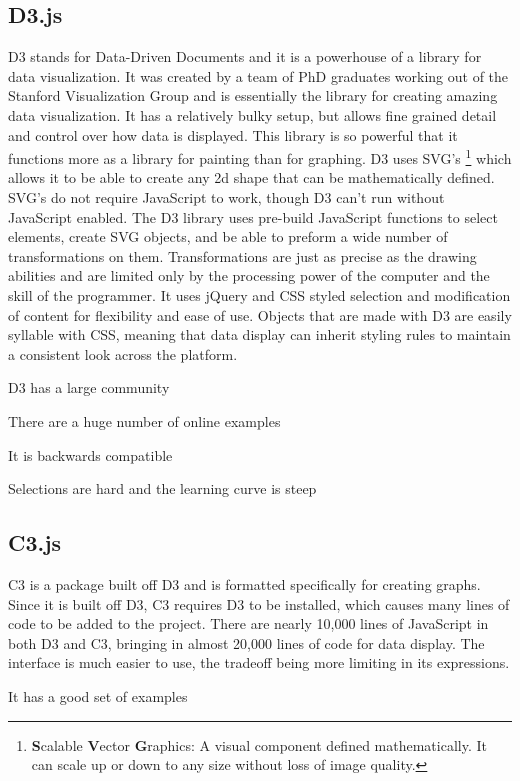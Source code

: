 \documentclass[draftclsnofoot,onecolumn,letterpaper,10pt,compsoc]{IEEEtran}
\begin{document}
  \subsection{D3.js}
  D3 stands for Data-Driven Documents and it is a powerhouse of a library for data visualization.
  It was created by a team of PhD graduates working out of the Stanford Visualization Group and is essentially the library for creating amazing data visualization.
  It has a relatively bulky setup, but allows fine grained detail and control over how data is displayed.
  This library is so powerful that it functions more as a library for painting than for graphing.
  D3 uses SVG's \footnote{\textbf{S}calable \textbf{V}ector \textbf{G}raphics: A visual component defined mathematically. It can scale up or down to any size without loss of image quality.} which allows it to be able to create any 2d shape that can be mathematically defined.
  SVG's do not require JavaScript to work, though D3 can't run without JavaScript enabled.
  The D3 library uses pre-build JavaScript functions to select elements, create SVG objects, and be able to preform a wide number of transformations on them.
  Transformations are just as precise as the drawing abilities and are limited only by the processing power of the computer and the skill of the programmer.
  It uses jQuery and CSS styled selection and modification of content for flexibility and ease of use.
  Objects that are made with D3 are easily syllable with CSS, meaning that data display can inherit styling rules to maintain a consistent look across the platform.

  D3 has a large community

  There are a huge number of online examples

  It is backwards compatible

  Selections are hard and the learning curve is steep

  \subsection{C3.js}
  C3 is a package built off D3 and is formatted specifically for creating graphs.
  Since it is built off D3, C3 requires D3 to be installed, which causes many lines of code to be added to the project.
  There are nearly 10,000 lines of JavaScript in both D3 and C3, bringing in almost 20,000 lines of code for data display.
  The interface is much easier to use, the tradeoff being more limiting in its expressions.

  It has a good set of examples
\end{document}
